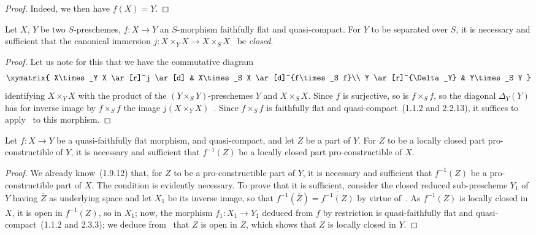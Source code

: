 \begin{proof}
Indeed, we then have $f(X)=Y$.
\end{proof}

\begin{corollary}[2.3.13]
\label{IV.2.3.13}
Let $X$, $Y$ be two $S$-preschemes, $f:X\to Y$ an $S$-morphism faithfully flat and quasi-compact.
For $Y$ to be separated over $S$, it is necessary and sufficient that the canonical immersion $j:X\times_Y X\to X\times_S X$~ be \emph{closed}.
\end{corollary}

\begin{proof}
Let us note for this that we have the commutative diagram~
\[
\xymatrix{
  X\times_Y X \ar[r]^j \ar[d] & X\times_S X \ar[d]^{f\times_S f}\\
  Y \ar[r]^{\Delta_Y} & Y\times_S Y
}
\]
identifying $X\times_Y X$ with the product of the $(Y\times_S Y)$-preschemes $Y$ and $X\times_S X$.
Since $f$ is surjective, so is $f\times_S f$, so the diagonal $\Delta_Y(Y)$ has for inverse image by $f\times_S f$ the image $j(X\times_Y X)$~.
Since $f\times_S f$ is faithfully flat and quasi-compact~(1.1.2 and 2.2.13), it suffices to apply~ to this morphism.
\end{proof}

\begin{corollary}[2.3.14]
\label{IV.2.3.14}
Let $f:X\to Y$ be a quasi-faithfully flat morphism, and quasi-compact, and let $Z$ be a part of $Y$.
For $Z$ to be a locally closed part pro-constructible of $Y$, it is necessary and sufficient that $f^{-1}(Z)$ be a locally closed part pro-constructible of $X$.
\end{corollary}

\begin{proof}
We already know~(1.9.12) that, for $Z$ to be a pro-constructible part of $Y$, it is necessary and sufficient that $f^{-1}(Z)$ be a pro-constructible part of $X$.
The condition is evidently necessary.
To prove that it is sufficient, consider the closed reduced sub-prescheme $Y_1$ of $Y$ having $\overline{Z}$ as underlying space and let $X_1$ be its inverse image, so that $f^{-1}(\overline{Z})=\overline{f^{-1}(Z)}$ by virtue of~.
As $f^{-1}(Z)$ is locally closed in $X$, it is open in $\overline{f^{-1}(Z)}$, so in $X_1$; now, the morphism $f_1:X_1\to Y_1$ deduced from $f$ by restriction is quasi-faithfully flat and quasi-compact~(1.1.2 and 2.3.3); we deduce from~ that $Z$ is open in $\overline{Z}$, which shows that $Z$ is locally closed in $Y$.
\end{proof}


